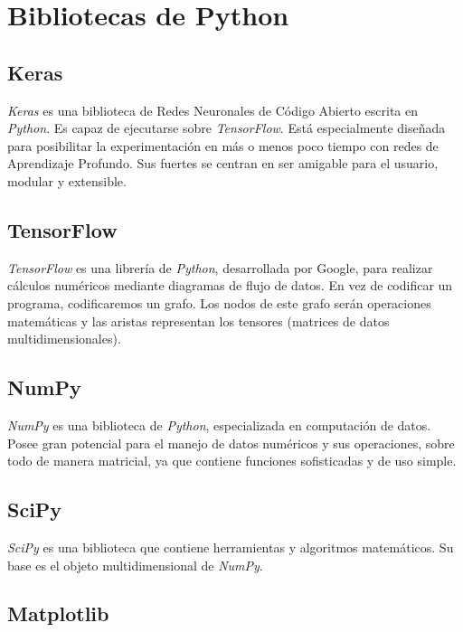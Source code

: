 \section{Bibliotecas de Python}

\subsection{Keras}

\textit{Keras} es una biblioteca de Redes Neuronales de Código Abierto escrita en \textit{Python}. Es capaz de ejecutarse sobre \textit{TensorFlow}. Está especialmente diseñada para posibilitar la experimentación en más o menos poco tiempo con redes de Aprendizaje Profundo. Sus fuertes se centran en ser amigable para el usuario, modular y extensible.

\subsection{TensorFlow}

\textit{TensorFlow} es una librería de \textit{Python}, desarrollada por Google, para realizar cálculos numéricos mediante diagramas de flujo de datos. En vez de codificar un programa, codificaremos un grafo. Los nodos de este grafo serán operaciones matemáticas y las aristas representan los tensores (matrices de datos multidimensionales).

\subsection{NumPy}

\textit{NumPy} \cite{TyH:numpy} es una biblioteca de \textit{Python}, especializada en computación de datos. Posee gran potencial para el manejo de datos numéricos y sus operaciones, sobre todo de manera matricial, ya que contiene funciones sofisticadas y de uso simple.

\subsection{SciPy}

\textit{SciPy} \cite{TyH:scipy} es una biblioteca que contiene herramientas y algoritmos matemáticos. Su base es el objeto multidimensional de \textit{NumPy}.

\subsection{Matplotlib}

